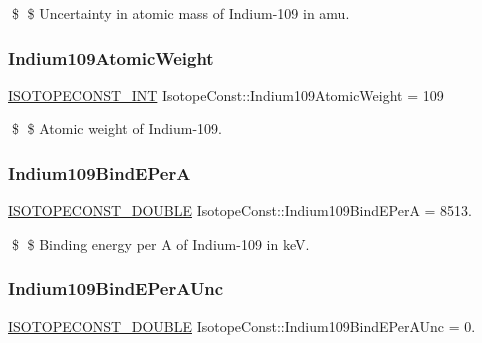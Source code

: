 \$ \$ Uncertainty in atomic mass of Indium-\/109 in amu. \mbox{\label{group___isotope_const-_indium-_in109_gac17475963a915d48261ad1a09ad63a68}} 
\subsubsection{\texorpdfstring{Indium109\+Atomic\+Weight}{Indium109AtomicWeight}}
{\footnotesize\ttfamily \mbox{\hyperlink{group___isotope_const-_macros_ga5f18360b3e99483a35c32d789e62621c}{I\+S\+O\+T\+O\+P\+E\+C\+O\+N\+S\+T\+\_\+\+I\+NT}} Isotope\+Const\+::\+Indium109\+Atomic\+Weight = 109}

\$ \$ Atomic weight of Indium-\/109. \mbox{\label{group___isotope_const-_indium-_in109_gad12738632cb018f5b989277e6ad6e64c}} 
\subsubsection{\texorpdfstring{Indium109\+Bind\+E\+PerA}{Indium109BindEPerA}}
{\footnotesize\ttfamily \mbox{\hyperlink{group___isotope_const-_macros_ga8f45a7272ce02c0b4c65c44636ed719a}{I\+S\+O\+T\+O\+P\+E\+C\+O\+N\+S\+T\+\_\+\+D\+O\+U\+B\+LE}} Isotope\+Const\+::\+Indium109\+Bind\+E\+PerA = 8513.}

\$ \$ Binding energy per A of Indium-\/109 in keV. \mbox{\label{group___isotope_const-_indium-_in109_ga74aea466e2de4ec92126e1c2b5056499}} 
\subsubsection{\texorpdfstring{Indium109\+Bind\+E\+Per\+A\+Unc}{Indium109BindEPerAUnc}}
{\footnotesize\ttfamily \mbox{\hyperlink{group___isotope_const-_macros_ga8f45a7272ce02c0b4c65c44636ed719a}{I\+S\+O\+T\+O\+P\+E\+C\+O\+N\+S\+T\+\_\+\+D\+O\+U\+B\+LE}} Isotope\+Const\+::\+Indium109\+Bind\+E\+Per\+A\+Unc = 0.}

